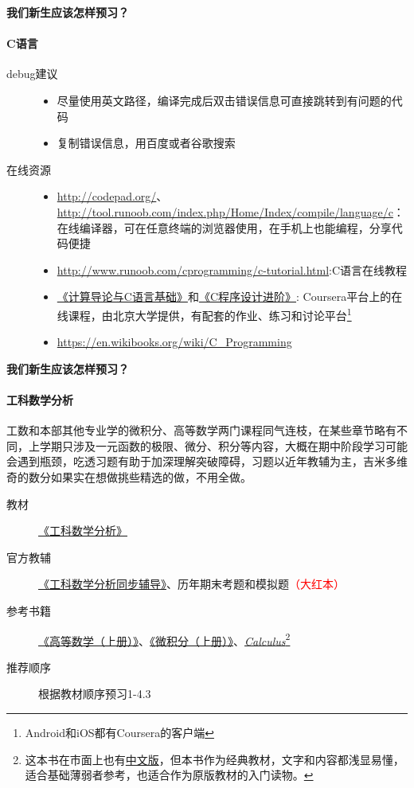 \documentclass[presentation]{beamer}
\begin{document}
\begin{CJK*}{UTF8}{gbsn}
\begin{frame}{\textbf{我们新生应该怎样预习？}}
\framesubtitle{C语言}
\begin{description}
    \item[debug建议]
    \begin{itemize}
    \item 尽量使用英文路径，编译完成后双击错误信息可直接跳转到有问题的代码
    \item 复制错误信息，用百度或者谷歌搜索
    \end{itemize}
    \item[在线资源] \begin{itemize}
    \item \url{http://codepad.org/}、\url{http://tool.runoob.com/index.php/Home/Index/compile/language/c}：在线编译器，可在任意终端的浏览器使用，在手机上也能编程，分享代码便捷
    \item \url{http://www.runoob.com/cprogramming/c-tutorial.html}:C语言在线教程
    \item \href{https://www.coursera.org/learn/jisuanji-biancheng}{《计算导论与C语言基础》}和\href{https://www.coursera.org/learn/c-chengxu-sheji}{《C程序设计进阶》}: Coursera平台上的在线课程，由北京大学提供，有配套的作业、练习和讨论平台\footnote{Android和iOS都有Coursera的客户端}
    \item \url{https://en.wikibooks.org/wiki/C_Programming}
    \end{itemize}
\end{description}
\end{frame}

\begin{frame}{\textbf{我们新生应该怎样预习？}}
\framesubtitle{工科数学分析}
\begin{block}{}
工数和本部其他专业学的微积分、高等数学两门课程同气连枝，在某些章节略有不同，上学期只涉及一元函数的极限、微分、积分等内容，大概在期中阶段学习可能会遇到瓶颈，吃透习题有助于加深理解突破障碍，习题以近年教辅为主，吉米多维奇的数分如果实在想做挑些精选的做，不用全做。
\end{block}
\begin{description}
    \item[教材] \href{http://opac.lib.dlut.edu.cn/opac/item.php?marc_no=2008000575}{《工科数学分析》}
    \item[官方教辅] \href{http://opac.lib.dlut.edu.cn/opac/item.php?marc_no=2010052839}{《工科数学分析同步辅导》}、历年期末考题和模拟题\textcolor{red}{（大红本）}
    \item[参考书籍] \href{http://opac.lib.dlut.edu.cn/opac/item.php?marc_no=2007023436}{《高等数学（上册）》}、\href{http://opac.lib.dlut.edu.cn/opac/item.php?marc_no=2009018280}{《微积分（上册）》}、\href{http://www.cengagebrain.com/content/stewart97815_0538497815_01.01_toc.pdf}{\textit{Calculus}}\footnote{这本书在市面上也有\href{http://item.jd.com/10075433.html}{中文版}，但本书作为经典教材，文字和内容都浅显易懂，适合基础薄弱者参考，也适合作为原版教材的入门读物。}
    \item[推荐顺序] 根据教材顺序预习1-4.3
    

\end{description}
\end{frame}
\end{CJK*}
\end{document}
